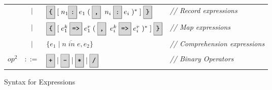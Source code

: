 \begin{figure}[!t]
{\begin{tabular}{rcll}
&{\huge\strut}$|$&$ \lcb [\;n_1\colont\;e_1\;(\;\comma\;\;n_i\;\colont\;e_i\;)^*\;]\rcb $ & {\em // Record expressions}\\

&{\huge\strut}$|$&$ \lcb [\;e^k_1\;\ra\;e^v_1\;(\;\comma\;\;e^k_i\;\ra\;e^v_i\;)^*\;]\rcb $ & {\em // Map expressions}\\

&{\huge\strut}$|$&$ \{ e_1\;|\;\overline{n\;in\;e}, e_2\} $ & {\em // Comprehension expressions}\\
&&&\\
$op^2$ & $::=$ & $\token{+}\;|\;\token{-}\;|\;\token{*}\;|\;\token{/}$& {\em // Binary Operators}\\
\end{tabular}}
\caption{Syntax for Expressions}
\end{figure}